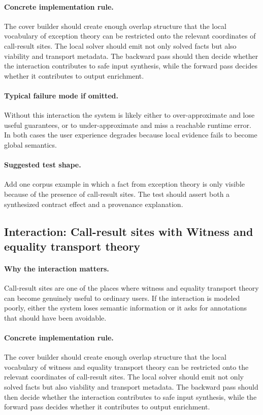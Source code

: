 \documentclass[11pt]{report}
\theoremstyle{definition}
\theoremstyle{plain}
\begin{document}
\paragraph{Concrete implementation rule.}
The cover builder should create enough overlap structure that the local
vocabulary of exception theory can be restricted onto the relevant
coordinates of call-result sites. The local solver should emit not only
solved facts but also viability and transport metadata. The backward pass
should then decide whether the interaction contributes to safe input
synthesis, while the forward pass decides whether it contributes to output
enrichment.

\paragraph{Typical failure mode if omitted.}
Without this interaction the system is likely either to over-approximate and
lose useful guarantees, or to under-approximate and miss a reachable runtime
error. In both cases the user experience degrades because local evidence
fails to become global semantics.

\paragraph{Suggested test shape.}
Add one corpus example in which a fact from exception theory is only
visible because of the presence of call-result sites. The test should
assert both a synthesized contract effect and a provenance explanation.

\subsection{Interaction: Call-result sites with Witness and equality transport theory}

\paragraph{Why the interaction matters.}
Call-result sites are one of the places where witness and equality transport theory can become
genuinely useful to ordinary users. If the interaction is modeled poorly,
either the system loses semantic information or it asks for annotations that
should have been avoidable.

\paragraph{Concrete implementation rule.}
The cover builder should create enough overlap structure that the local
vocabulary of witness and equality transport theory can be restricted onto the relevant
coordinates of call-result sites. The local solver should emit not only
solved facts but also viability and transport metadata. The backward pass
should then decide whether the interaction contributes to safe input
synthesis, while the forward pass decides whether it contributes to output
enrichment.
\end{document}
